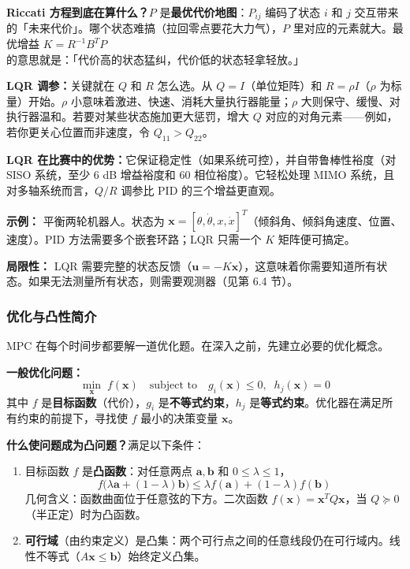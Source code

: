 \textbf{Riccati 方程到底在算什么？}$P$ 是\textbf{最优代价地图}：$P_{ij}$ 编码了状态 $i$ 和 $j$ 交互带来的「未来代价」。哪个状态难搞（拉回零点要花大力气），$P$ 里对应的元素就大。最优增益 $K = R^{-1}B^T P$ 的意思就是：「代价高的状态猛纠，代价低的状态轻拿轻放。」

\textbf{LQR 调参：}关键就在 $Q$ 和 $R$ 怎么选。从 $Q = I$（单位矩阵）和 $R = \rho I$（$\rho$ 为标量）开始。$\rho$ 小意味着激进、快速、消耗大量执行器能量；$\rho$ 大则保守、缓慢、对执行器温和。若要对某些状态施加更大惩罚，增大 $Q$ 对应的对角元素——例如，若你更关心位置而非速度，令 $Q_{11} > Q_{22}$。

\textbf{LQR 在比赛中的优势：}它保证稳定性（如果系统可控），并自带鲁棒性裕度（对 SISO 系统，至少 6 dB 增益裕度和 60\textdegree{} 相位裕度）。它轻松处理 MIMO 系统，且对多轴系统而言，$Q/R$ 调参比 PID 的三个增益更直观。

\textbf{示例：} 平衡两轮机器人。状态为 $\mathbf{x} = [\theta, \dot{\theta}, x, \dot{x}]^T$（倾斜角、倾斜角速度、位置、速度）。PID 方法需要多个嵌套环路；LQR 只需一个 $K$ 矩阵便可搞定。

\textbf{局限性：} LQR 需要完整的状态反馈（$\mathbf{u} = -K\mathbf{x}$），这意味着你需要知道所有状态。如果无法测量所有状态，则需要观测器（见第 6.4 节）。

\subsubsection{优化与凸性简介}

MPC 在每个时间步都要解一道优化题。在深入之前，先建立必要的优化概念。

\textbf{一般优化问题：}
\[
\min_{\mathbf{x}} \; f(\mathbf{x}) \quad \text{subject to} \quad g_i(\mathbf{x}) \leq 0, \;\; h_j(\mathbf{x}) = 0
\]
其中 $f$ 是\textbf{目标函数}（代价），$g_i$ 是\textbf{不等式约束}，$h_j$ 是\textbf{等式约束}。优化器在满足所有约束的前提下，寻找使 $f$ 最小的决策变量 $\mathbf{x}$。

\textbf{什么使问题成为凸问题？}满足以下条件：
\begin{enumerate}[nosep]
    \item 目标函数 $f$ 是\textbf{凸函数}：对任意两点 $\mathbf{a}, \mathbf{b}$ 和 $0 \leq \lambda \leq 1$，
    \[
    f\bigl(\lambda \mathbf{a} + (1-\lambda)\mathbf{b}\bigr) \leq \lambda f(\mathbf{a}) + (1-\lambda) f(\mathbf{b})
    \]
    几何含义：函数曲面位于任意弦的下方。二次函数 $f(\mathbf{x}) = \mathbf{x}^T Q \mathbf{x}$，当 $Q \succeq 0$（半正定）时为凸函数。
    \item \textbf{可行域}（由约束定义）是凸集：两个可行点之间的任意线段仍在可行域内。线性不等式（$A\mathbf{x} \leq \mathbf{b}$）始终定义凸集。
\end{enumerate}

